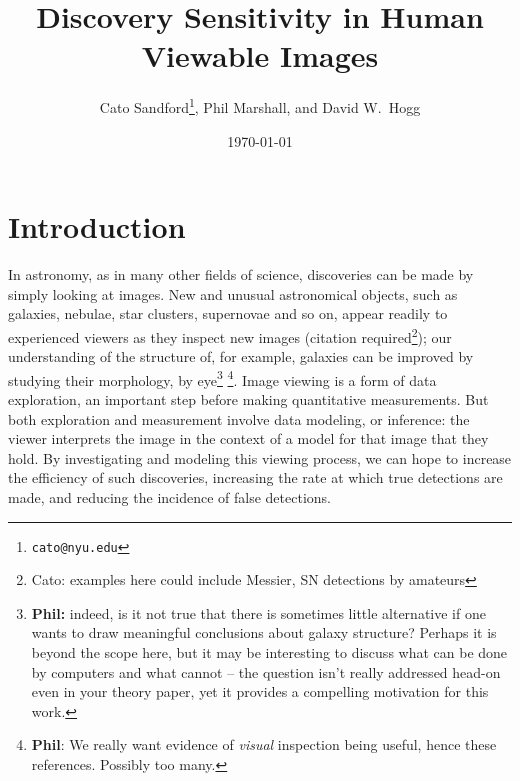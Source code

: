 \documentclass[letterpaper, 11pt]{article}
\title{Discovery Sensitivity in Human Viewable Images}
\author{Cato Sandford\thanks{\texttt{cato@nyu.edu}},
        Phil Marshall,
    and David W.\ Hogg}
\date{\today}
\begin{document}
\maketitle


\section{Introduction}

In astronomy, as in many other fields of science, discoveries can be made by
simply looking at images. New and unusual astronomical objects, such as
galaxies, nebulae, star clusters, supernovae and so on, appear readily to
experienced viewers as they inspect new images (citation
required\footnote{Cato: examples here could include  Messier, SN detections by
amateurs}); our understanding of  the structure of, for example, galaxies can
be improved by studying their morphology, by eye\footnote{{\bf Phil:} indeed, is it not true that there is sometimes little alternative if one wants to draw meaningful conclusions about galaxy structure? Perhaps it is beyond the scope here, but it may be interesting to discuss what can be done by computers and what cannot -- the question isn't really addressed head-on even in your theory paper, yet it provides a compelling motivation for this work.} \citep[e.g.][]{Lah95, Lah++95, For++11, But11}\footnote{{\bf Phil}: We really want evidence of \emph{visual} inspection being useful, hence these references. Possibly too many.}.
Image viewing is a form of data exploration, an important step before making
quantitative measurements. But both exploration and measurement involve data
modeling, or inference: the viewer interprets the image in the context of a
model for that image that they hold.  By investigating and modeling this
viewing process, we can hope to increase the efficiency of such discoveries,
increasing the rate at which true detections are made, and reducing the
incidence of false detections. 
\end{document}
